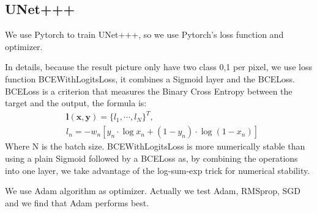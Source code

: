 \subsection{UNet+++}
We use Pytorch to train UNet+++, so we use Pytorch's loss function and optimizer.

In details, because the result picture only have two class 0,1 per pixel, we use loss function BCEWithLogitsLoss, it combines a Sigmoid layer and the BCELoss. 
BCELoss is a criterion that measures the Binary Cross Entropy between the target and the output, the formula is:
\[\begin{aligned}
    &\mathbf{l}(\mathbf{x}, \mathbf{y})=\{l_1, \cdots, l_N\}^T, \\
    &l_n=-w_n[y_n\cdot\log{x_n}+(1-y_n)\cdot\log{(1-x_n)}]
\end{aligned}\]
Where N is the batch size. BCEWithLogitsLoss is more numerically stable than using a plain Sigmoid followed by a BCELoss as, 
by combining the operations into one layer, we take advantage of the log-sum-exp trick for numerical stability.

We use Adam algorithm as optimizer. Actually we test Adam, RMSprop, SGD and we find that Adam performs best.
